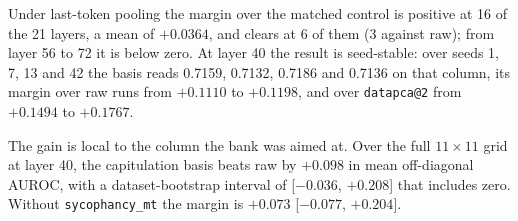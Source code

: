 Under last-token pooling the margin over the matched control is positive at 16 of the 21 layers, a mean of $+0.0364$, and clears at 6 of them (3 against raw); from layer 56 to 72 it is below zero. %
At layer 40 the result is seed-stable: over seeds 1, 7, 13 and 42 the basis reads 0.7159, 0.7132, 0.7186 and 0.7136 on that column, its margin over raw runs from $+0.1110$ to $+0.1198$, and over \texttt{datapca@2} from $+0.1494$ to $+0.1767$. %

The gain is local to the column the bank was aimed at. %
Over the full $11 \times 11$ grid at layer 40, the capitulation basis beats raw by $+0.098$ in mean off-diagonal AUROC, with a dataset-bootstrap interval of [$-0.036$, $+0.208$] that includes zero. %
Without \texttt{sycophancy\_mt} the margin is $+0.073$ [$-0.077$, $+0.204$]. %


